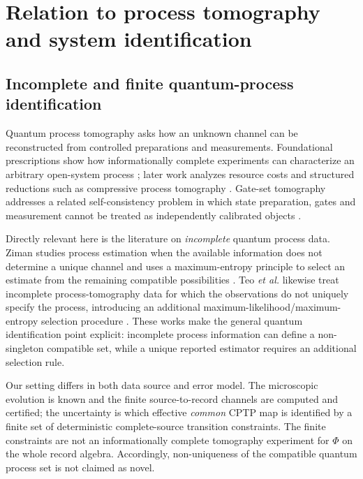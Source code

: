 \section{Relation to process tomography and system identification}
\label{sec:literature}

\subsection{Incomplete and finite quantum-process identification}

Quantum process tomography asks how an unknown channel can be reconstructed from controlled preparations and measurements.  Foundational prescriptions show how informationally complete experiments can characterize an arbitrary open-system process \cite{ChuangNielsen1997,PoyatosCiracZoller1997}; later work analyzes resource costs and structured reductions such as compressive process tomography \cite{MohseniRezakhaniLidar2008,ShabaniEtAl2011}.  Gate-set tomography addresses a related self-consistency problem in which state preparation, gates and measurement cannot be treated as independently calibrated objects \cite{BlumeKohoutEtAl2017}.

Directly relevant here is the literature on \emph{incomplete} quantum process data.  Ziman studies process estimation when the available information does not determine a unique channel and uses a maximum-entropy principle to select an estimate from the remaining compatible possibilities \cite{Ziman2008}.  Teo \emph{et al.} likewise treat incomplete process-tomography data for which the observations do not uniquely specify the process, introducing an additional maximum-likelihood/maximum-entropy selection procedure \cite{TeoEtAl2011}.  These works make the general quantum identification point explicit: incomplete process information can define a non-singleton compatible set, while a unique reported estimator requires an additional selection rule.

Our setting differs in both data source and error model.  The microscopic evolution is known and the finite source-to-record channels are computed and certified; the uncertainty is which effective \emph{common} CPTP map is identified by a finite set of deterministic complete-source transition constraints.  The finite constraints are not an informationally complete tomography experiment for $\Phi$ on the whole record algebra.  Accordingly, non-uniqueness of the compatible quantum process set is not claimed as novel.

